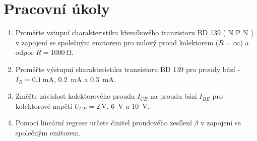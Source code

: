 \documentclass[a4paper]{article}
\author{Vladislav Wohlrath}
\begin{document}
\begin{titlepage}

\end{titlepage}

\section*{Pracovní úkoly}
\begin{enumerate}
\item Proměřte vstupní charakteristiku křemíkového tranzistoru BD 139 ( N P N ) v zapojení se společným emitorem pro nulový proud kolektorem ($R=\infty$) a odpor $R=\SI{1000}{\ohm}$.
\item Proměřte výstupní charakteristiku tranzistoru BD 139 pro proudy bází - $I_B= \SI{0.1}{\milli\ampere}$, \SI{0.2}{\milli\ampere} a \SI{0.3}{\milli\ampere}.
\item Změřte závislost kolektorového proudu $I_{CE}$ na proudu bází $I_{BE}$ pro kolektorové napětí $U_{CE} = \SI{2}{\volt}$, \SI{6}{\volt} a \SI{10}{\volt}.
\item Pomocí lineární regrese určete činitel proudového zesílení $\beta$ v zapojení se společným emitorem.
\end{enumerate}










\printbibliography[title={Seznam použité literatury}]
\end{document}

